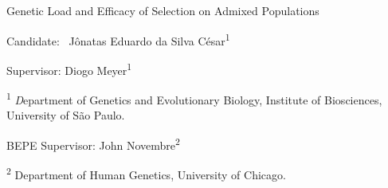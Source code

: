 \documentclass[a4paper, 12pt]{article}
\newcommand{\ts}{\textsuperscript}
\begin{document}
	\begin{center}
    \Large{Genetic Load and Efficacy of Selection on Admixed Populations} 
  \end{center}
	
	\begin{flushright}

   \begin{list}{}{
      \setlength{\leftmargin}{7.5cm}
      \setlength{\rightmargin}{0cm}
      \setlength{\labelwidth}{0pt}
      \setlength{\labelsep}{\leftmargin}}

      \begin{list}{}{
      \setlength{\leftmargin}{0cm}
      \setlength{\rightmargin}{0cm}
      \setlength{\labelwidth}{0pt}
      \setlength{\labelsep}{\leftmargin}}

  \item Candidate: \
    Jônatas Eduardo da Silva César\ts 1\\
      \item Supervisor: Diogo Meyer\ts 1\\
      \item \ts 1 {\small \textit Department of Genetics and Evolutionary Biology, Institute
          of Biosciences, University of São Paulo.}
      \item BEPE Supervisor: John Novembre\ts 2\
      \item \ts 2 {\small Department of Human Genetics, University of Chicago.}
      \end{list}
   \end{list}
\end{flushright}
\vspace{1cm}
\end{document}
